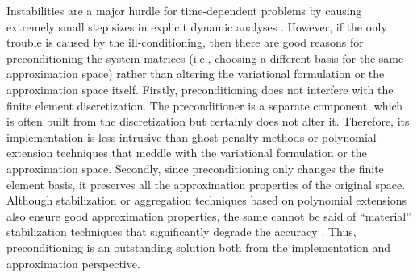 \documentclass{article}
\numberwithin{equation}{section}
\theoremstyle{definition}
\begin{document}
Instabilities are a major hurdle for time-dependent problems by causing extremely small step sizes in explicit dynamic analyses \cite{stoter2023critical,bioli2025theoretical,hollweck2026analysis}. However, if the only trouble is caused by the ill-conditioning, then there are good reasons for preconditioning the system matrices (i.e., choosing a different basis for the same approximation space) rather than altering the variational formulation or the approximation space itself. Firstly, preconditioning does not interfere with the finite element discretization. The preconditioner is a separate component, which is often built from the discretization but certainly does not alter it. Therefore, its implementation is less intrusive than ghost penalty methods or polynomial extension techniques that meddle with the variational formulation or the approximation space. Secondly, since preconditioning only changes the finite element basis, it preserves all the approximation properties of the original space. Although stabilization or aggregation techniques based on polynomial extensions also ensure good approximation properties, the same cannot be said of ``material'' stabilization techniques that significantly degrade the accuracy \cite{garhuom2022eigenvalue,sartorti2025stabilization}. Thus, preconditioning is an outstanding solution both from the implementation and approximation perspective. 
\end{document}
